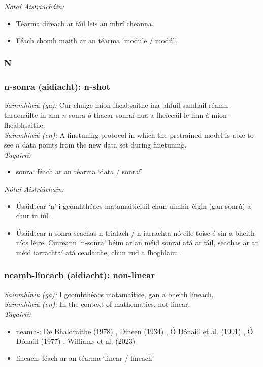  \noindent \textit{Nótaí Aistriúcháin:}
\begin{itemize}
	\item Téarma díreach ar fáil leis an mbrí chéanna.
	\item Féach chomh maith ar an téarma `module / modúl'.
\end{itemize}


 \subsubsection*{N}

\subsubsection*{n-sonra (aidiacht): n-shot}
 \noindent \textit{Sainmhíniú (ga):} Cur chuige mion-fheabsaithe ina bhfuil samhail réamh-thraenáilte in ann $n$ sonra ó thacar sonraí nua a fheiceáil le linn á mion-fheabhsaithe.
\\
 \noindent \textit{Sainmhíniú (en):} A finetuning protocol in which the pretrained model is able to see $n$ data points from the new data set during finetuning.
\\
 \noindent \textit{Tagairtí:}
\begin{itemize}
	\item sonra: féach ar an téarma `data / sonraí'
\end{itemize}

 \noindent \textit{Nótaí Aistriúcháin:}
\begin{itemize}
	\item Úsáidtear `n' i gcomhthéacs matamaiticiúil chun uimhir éigin (gan sonrú) a chur in iúl.
	\item Úsáidtear n-sonra seachas n-trialach / n-iarrachta nó eile toisc é sin a bheith níos léire. Cuireann `n-sonra' béim ar an méid sonraí atá ar fáil, seachas ar an méid iarrachtaí atá ceadaithe, chun rud a fhoghlaim.
\end{itemize}


\subsubsection*{neamh-líneach (aidiacht): non-linear}
 \noindent \textit{Sainmhíniú (ga):} I gcomhthéacs matamaitice, gan a bheith líneach.
\\
 \noindent \textit{Sainmhíniú (en):} In the context of mathematics, not linear.
\\
 \noindent \textit{Tagairtí:}
\begin{itemize}
	\item neamh-: De Bhaldraithe (1978) \cite{de-bhaldraithe}, Dineen (1934) \cite{dineen}, Ó Dónaill et al. (1991) \cite{focloir-beag}, Ó Dónaill (1977) \cite{odonaill}, Williams et al. (2023) \cite{storchiste}
	\item líneach: féach ar an téarma `linear / líneach'
\end{itemize}

